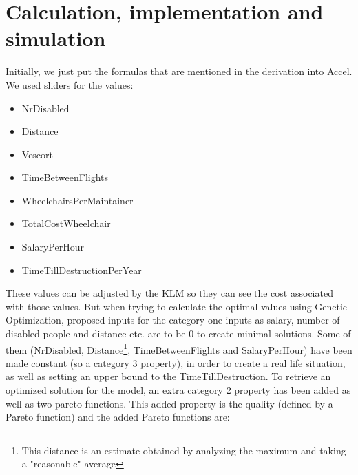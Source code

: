 \documentclass[a4paper, 11pt, notitlepage]{report}
\begin{document}

\chapter{Calculation, implementation and simulation}
Initially, we just put the formulas that are mentioned in the derivation into Accel. We used sliders for the values:
    \begin{itemize}
    \itemsep0em
    \item\vspace{-8pt} NrDisabled
    \item Distance
    \item Vescort
    \item TimeBetweenFlights
    \item WheelchairsPerMaintainer
    \item TotalCostWheelchair
    \item SalaryPerHour
    \item TimeTillDestructionPerYear
    \end{itemize}

\vspace{-4pt}These values can be adjusted by the KLM so they can see the cost associated with those values. But when trying to calculate the optimal values using Genetic Optimization, proposed inputs for the category one inputs as salary, number of disabled people and distance etc. are to be 0 to create minimal solutions. Some of them (NrDisabled\cite{ref5}, Distance\footnote{This distance is an estimate obtained by analyzing the maximum\cite{ref7} and taking a "reasonable" average}, TimeBetweenFlights\cite{ref6} and SalaryPerHour\cite{ref2}) have been made constant (so a category 3 property), in order to create a real life situation, as well as setting an upper bound to the TimeTillDestruction\cite{ref4}. To retrieve an optimized solution for the model, an extra category 2 property has been added as well as two pareto functions. This added property is the quality (defined by a Pareto function) and the added Pareto functions are:
\end{document}
